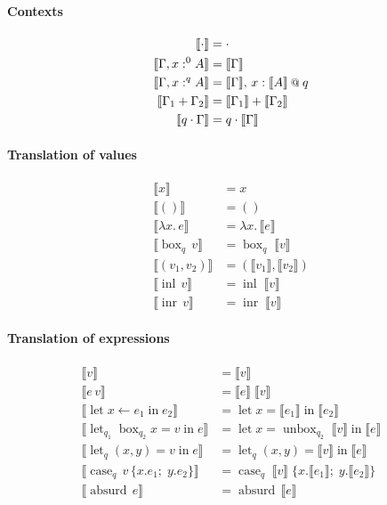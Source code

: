 \documentclass[acmsmall,screen,nonacm]{acmart}
\makeatletter
\DeclareMathOperator{\llet}{\text{let}}
\DeclareMathOperator{\lin}{\text{in}}
\DeclareMathOperator{\case}{\text{case}}
\DeclareMathOperator{\bbox}{\text{box}}
\DeclareMathOperator{\unbox}{\text{unbox}}
\newcommand{\at}{\mathbin{\mbox{\small\ensuremath{@}}}}
\DeclareMathOperator{\inl}{\text{inl}}
\DeclareMathOperator{\inr}{\text{inr}}
\DeclareMathOperator{\absurd}{\text{absurd}}
\newcommand{\sem}[1]{\llbracket #1 \rrbracket}
\makeatother
\begin{document}
\paragraph{Contexts}
%
\begin{align*}
  \sem{\cdot} &= \cdot \\
  \sem{\Gamma, x :^0 A} &= \sem{\Gamma} \\
  \sem{\Gamma, x :^q A} &= \sem{\Gamma},\, x : \sem{A} \at q \\
  \sem{\Gamma_1 + \Gamma_2} &= \sem{\Gamma_1} + \sem{\Gamma_2} \\
  \sem{q \cdot \Gamma} &= q \cdot \sem{\Gamma}
\end{align*}

\paragraph{Translation of values}
%
\begin{align*}
  \sem{x} &= x \\
  \sem{()} &= () \\
  \sem{\lambda x.\, e} &= \lambda x.\, \sem{e} \\
  \sem{\bbox_q\, v} &= \bbox_q\; \sem{v} \\
  \sem{(v_1, v_2)} &= (\sem{v_1}, \sem{v_2}) \\
  \sem{\inl\, v} &= \inl\; \sem{v} \\
  \sem{\inr\, v} &= \inr\; \sem{v}
\end{align*}

\paragraph{Translation of expressions}
%
\begin{align*}
  \sem{v} &= \sem{v} \\
  \sem{e\, v} &= \sem{e}\; \sem{v} \\
  \sem{\llet x \leftarrow e_1 \lin e_2}
    &= \llet x = \sem{e_1} \lin \sem{e_2} \\
  \sem{\llet_{q_1} \bbox_{q_2} x = v \lin e}
    &= \llet x = \unbox_{q_2}\; \sem{v} \lin \sem{e} \\
  \sem{\llet_q (x, y) = v \lin e}
    &= \llet_q (x, y) = \sem{v} \lin \sem{e} \\
  \sem{\case_q\, v\, \{x.e_1;\; y.e_2\}}
    &= \case_q\; \sem{v}\; \{x.\sem{e_1};\; y.\sem{e_2}\} \\
  \sem{\absurd \, e} &= \absurd \, \sem{e}
\end{align*}
\\
\end{document}

